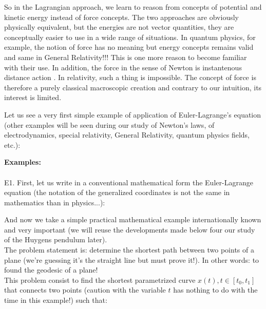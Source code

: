 	So in the Lagrangian approach, we learn to reason from concepts of potential and kinetic energy instead of force concepts. The two approaches are obviously physically equivalent, but the energies are not vector quantities, they are conceptually easier to use in a wide range of situations. In quantum physics, for example, the notion of force has no meaning but energy concepts remains valid and same in General Relativity!!! This is one more reason to become familiar with their use. In addition, the force in the sense of Newton is instantenous distance action . In relativity, such a thing is impossible. The concept of force is therefore a purely classical macroscopic creation and contrary to our intuition, its interest is limited.

	Let us see a very first simple example of application of Euler-Lagrange's equation (other examples will be seen during our study of Newton's laws, of electrodynamics, special relativity, General Relativity, quantum physics fields, etc.):
	\begin{tcolorbox}[colframe=black,colback=white,sharp corners]
	\textbf{{\Large {}}Examples:}\\\\
	E1. First, let us write in a conventional mathematical form the Euler-Lagrange equation  (the notation of the generalized coordinates is not the same in mathematics than in physics...):
	
	And now we take a simple practical mathematical example internationally known and very important (we will reuse the developments made below four our study of the Huygens pendulum later). \\

	The problem statement is: determine the shortest path between two points of a plane (we're guessing it's the straight line but must prove it!). In other words: to found the geodesic of a plane!\\
	
	This problem consist to find the shortest parametrized curve  $x(t),t\in[t_0,t_1]$that connects two points (caution with the variable $t$ has nothing to do with the time in this example!) such that:
	
	\end{tcolorbox}
	
